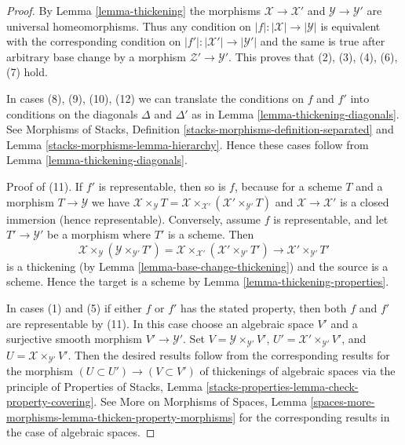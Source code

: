 \documentclass[10pt,a4paper]{amsart}
\theoremstyle{plain}
\theoremstyle{definition}
\theoremstyle{remark}
\numberwithin{equation}{subsection}
\begin{document}
\begin{proof}
By Lemma \ref{lemma-thickening} the morphisms $\mathcal{X} \to \mathcal{X}'$
and $\mathcal{Y} \to \mathcal{Y}'$ are universal homeomorphisms. Thus any
condition on $|f| : |\mathcal{X}| \to |\mathcal{Y}|$ is equivalent with
the corresponding condition on $|f'| : |\mathcal{X}'| \to |\mathcal{Y}'|$
and the same is true after arbitrary base change by a morphism
$\mathcal{Z}' \to \mathcal{Y}'$. This proves that
(2), (3), (4), (6), (7) hold.

\medskip\noindent
In cases (8), (9), (10), (12) we can translate the conditions on
$f$ and $f'$ into conditions on the diagonals $\Delta$ and $\Delta'$
as in Lemma \ref{lemma-thickening-diagonals}. See
Morphisms of Stacks, Definition \ref{stacks-morphisms-definition-separated} and
Lemma \ref{stacks-morphisms-lemma-hierarchy}.
Hence these cases follow from Lemma \ref{lemma-thickening-diagonals}.

\medskip\noindent
Proof of (11). If $f'$ is representable, then so is $f$, because
for a scheme $T$ and a morphism $T \to \mathcal{Y}$ we have
$\mathcal{X} \times_\mathcal{Y} T =
\mathcal{X} \times_{\mathcal{X}'} (\mathcal{X}' \times_{\mathcal{Y}'} T)$
and $\mathcal{X} \to \mathcal{X}'$ is a closed immersion (hence representable).
Conversely, assume $f$ is representable, and let $T' \to \mathcal{Y}'$
be a morphism where $T'$ is a scheme. Then
$$
\mathcal{X} \times_{\mathcal{Y}}
(\mathcal{Y} \times_{\mathcal{Y}'} T') =
\mathcal{X} \times_{\mathcal{X}'}
(\mathcal{X}' \times_{\mathcal{Y}'} T') \to
\mathcal{X}' \times_{\mathcal{Y}'} T'
$$
is a thickening (by Lemma \ref{lemma-base-change-thickening})
and the source is a scheme. Hence the target is a scheme by
Lemma \ref{lemma-thickening-properties}.

\medskip\noindent
In cases (1) and (5) if either $f$ or $f'$ has the stated property,
then both $f$ and $f'$ are representable by (11). In this case
choose an algebraic space $V'$ and a surjective smooth morphism
$V' \to \mathcal{Y}'$. Set $V = \mathcal{Y} \times_{\mathcal{Y}'} V'$,
$U' = \mathcal{X}' \times_{\mathcal{Y}'} V'$, and
$U = \mathcal{X} \times_{\mathcal{Y}'} V'$. Then the desired
results follow from the corresponding results for
the morphism $(U \subset U') \to (V \subset V')$ of thickenings
of algebraic spaces via the principle of Properties of Stacks, Lemma
\ref{stacks-properties-lemma-check-property-covering}.
See More on Morphisms of Spaces, Lemma
\ref{spaces-more-morphisms-lemma-thicken-property-morphisms}
for the corresponding results in the case of algebraic spaces.
\end{proof}
\end{document}
